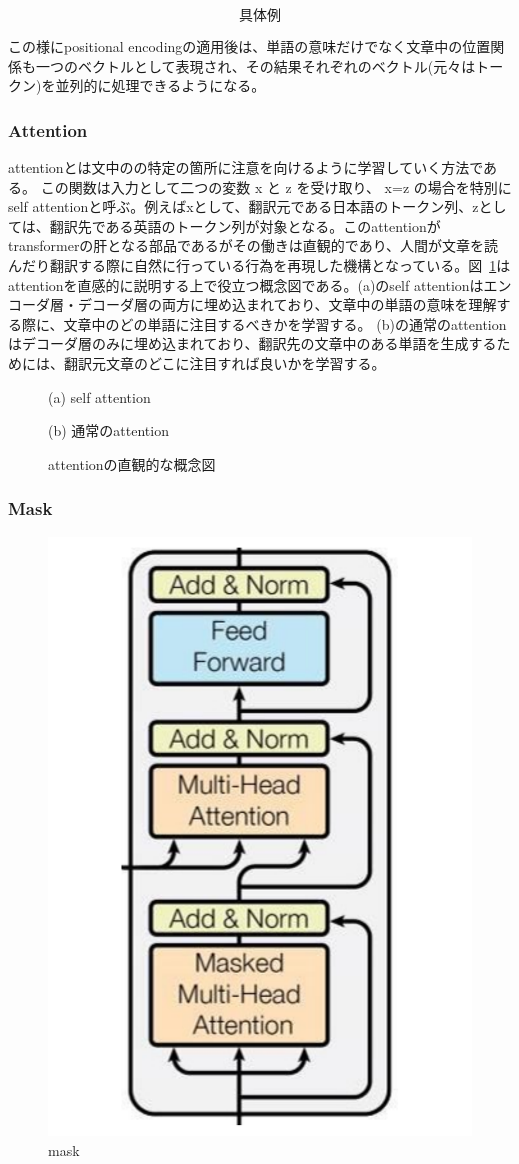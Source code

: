 \begin{equation*}
  \text{具体例}
\end{equation*}

この様にpositional encodingの適用後は、単語の意味だけでなく文章中の位置関係も一つのベクトルとして表現され、その結果それぞれのベクトル(元々はトークン)を並列的に処理できるようになる。


\subsubsection{Attention}
attentionとは文中のの特定の箇所に注意を向けるように学習していく方法である。 この関数は入力として二つの変数 x と z を受け取り、 x=z の場合を特別にself attentionと呼ぶ。例えばxとして、翻訳元である日本語のトークン列、zとしては、翻訳先である英語のトークン列が対象となる。このattentionがtransformerの肝となる部品であるがその働きは直観的であり、人間が文章を読んだり翻訳する際に自然に行っている行為を再現した機構となっている。図~\ref{fig:att-abs}はattentionを直感的に説明する上で役立つ概念図である。(a)のself attentionはエンコーダ層・デコーダ層の両方に埋め込まれており、文章中の単語の意味を理解する際に、文章中のどの単語に注目するべきかを学習する。 (b)の通常のattentionはデコーダ層のみに埋め込まれており、翻訳先の文章中のある単語を生成するためには、翻訳元文章のどこに注目すれば良いかを学習する。


\begin{figure}
  \centering

    (a) self attention
    \vspace{5mm}

    (b) 通常のattention

  \caption{attentionの直観的な概念図}
\label{fig:att-abs}
\end{figure}

\subsubsection{Mask}

\begin{figure}
  \centering
  \includegraphics[width=0.5\linewidth]{fig/decoder.pdf}
  \caption{mask}
\label{fig:mask}
\end{figure}

